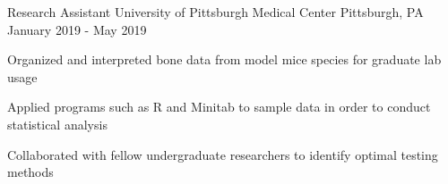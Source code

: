 \begin{cventries}
  \cventry
    {Research Assistant} %
    {University of Pittsburgh Medical Center} %
    {Pittsburgh, PA} %
    {January 2019 - May 2019} %
    {
      \begin{cvitems} %
        \item {Organized and interpreted bone data from model mice species for graduate lab usage}
        \item {Applied programs such as R and Minitab to sample data in order to conduct statistical analysis}
        \item {Collaborated with fellow undergraduate researchers to identify optimal testing methods}
      \end{cvitems}
    }

\end{cventries}
